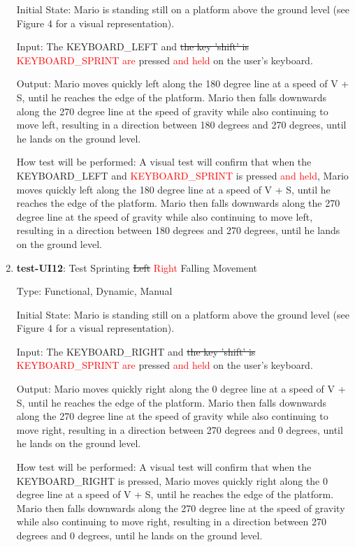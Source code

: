 \documentclass[12pt, titlepage]{article}
\begin{document}
\begin{enumerate}
Initial State: Mario is standing still on a platform above the ground level (see Figure 4 for a visual representation).

Input: The KEYBOARD\_LEFT and \sout{the key 'shift' is} \textcolor{red}{KEYBOARD\_SPRINT are} pressed \textcolor{red}{and held} on the user's keyboard.

Output: Mario moves quickly left along the 180 degree line at a speed of V + S, until he reaches the edge of the platform. Mario then falls downwards along the 270 degree line at the speed of gravity while also continuing to move left, resulting in a direction between 180 degrees and 270 degrees, until he lands on the ground level.

How test will be performed: A visual test will confirm that when the KEYBOARD\_LEFT and \textcolor{red}{KEYBOARD\_SPRINT} is pressed \textcolor{red}{and held}, Mario moves quickly left along the 180 degree line at a speed of V + S, until he reaches the edge of the platform. Mario then falls downwards along the 270 degree line at the speed of gravity while also continuing to move left, resulting in a direction between 180 degrees and 270 degrees, until he lands on the ground level.

\item{\textbf{test-UI12}: Test Sprinting \sout{Left} \textcolor{red}{Right} Falling Movement\\}

Type: Functional, Dynamic, Manual

Initial State: Mario is standing still on a platform above the ground level (see Figure 4 for a visual representation).

Input: The KEYBOARD\_RIGHT and \sout{the key 'shift' is} \textcolor{red}{KEYBOARD\_SPRINT are} pressed \textcolor{red}{and held} on the user's keyboard.

Output: Mario moves quickly right along the 0 degree line at a speed of V + S, until he reaches the edge of the platform. Mario then falls downwards along the 270 degree line at the speed of gravity while also continuing to move right, resulting in a direction between 270 degrees and 0 degrees, until he lands on the ground level.

How test will be performed: A visual test will confirm that when the KEYBOARD\_RIGHT is pressed, Mario moves quickly right along the 0 degree line at a speed of V + S, until he reaches the edge of the platform. Mario then falls downwards along the 270 degree line at the speed of gravity while also continuing to move right, resulting in a direction between 270 degrees and 0 degrees, until he lands on the ground level.


\end{enumerate}
\end{document}

